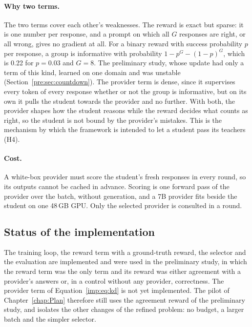 \paragraph{Why two terms.} The two terms cover each other's weaknesses. The reward is
exact but sparse: it is one number per response, and a prompt on which all $G$
responses are right, or all wrong, gives no gradient at all. For a binary reward with
success probability $p$ per response, a group is informative with probability
$1 - p^G - (1 - p)^G$, which is 0.22 for $p = 0.03$ and $G = 8$. The preliminary study,
whose update had only a term of this kind, learned on one domain and was unstable
(Section~\ref{pre:sec:countdown}). The provider term is dense, since it supervises
every token of every response whether or not the group is informative, but on its own
it pulls the student towards the provider and no further. With both, the provider
shapes how the student reasons while the reward decides what counts as right, so the
student is not bound by the provider's mistakes. This is the mechanism by which the
framework is intended to let a student pass its teachers (H4).

\paragraph{Cost.} A white-box provider must score the student's fresh responses in
every round, so its outputs cannot be cached in advance. Scoring is one forward pass of
the provider over the batch, without generation, and a 7B provider fits beside the
student on one 48\,GB GPU. Only the selected provider is consulted in a round.

\subsection{Status of the implementation}
\label{imp:sec:status}

The training loop, the reward term with a ground-truth reward, the selector and the
evaluation are implemented and were used in the preliminary study, in which the reward
term was the only term and its reward was either agreement with a provider's answers or,
in a control without any provider, correctness. The provider term of
Equation~\ref{imp:eq:kd} is not yet implemented. The pilot of Chapter~\ref{chap:Plan}
therefore still uses the agreement reward of the preliminary study, and isolates the
other changes of the refined problem: no budget, a larger batch and the simpler
selector.

